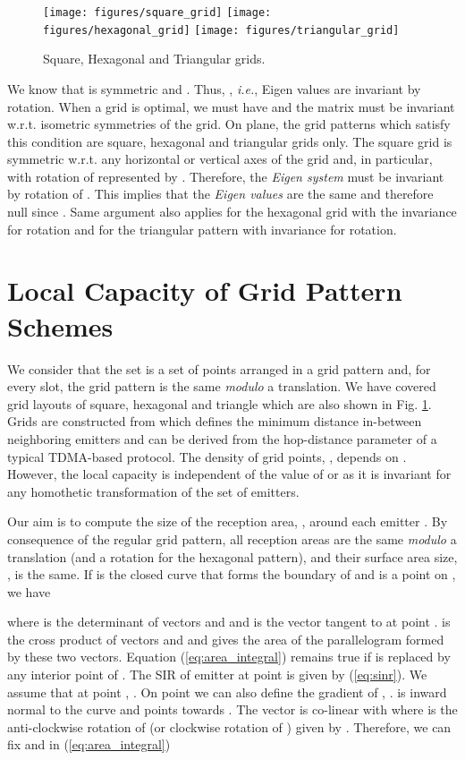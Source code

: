 \documentclass[12pt,english]{article}
\begin{document}
\begin{figure}[!t]
\centering
{}
\texttt{[image: figures/square\_grid]}
\texttt{[image: figures/hexagonal\_grid]}
\texttt{[image: figures/triangular\_grid]}
\caption{Square, Hexagonal and Triangular grids.}
\label{fig:grid_layouts}
\end{figure}

We know that  is symmetric and . Thus, \mbox{}, {\it i.e.}, Eigen values are invariant by rotation. When a grid is optimal, we must have \mbox{} and the matrix  must be invariant w.r.t. isometric symmetries of the grid. On  plane, the grid patterns which satisfy this condition are square, hexagonal and triangular grids only. The square grid is symmetric w.r.t. any horizontal or vertical axes of the grid and, in particular, with rotation of  represented by . Therefore, the {\em Eigen system} must be invariant by rotation of . This implies that the {\em Eigen values} are the same and therefore null since \mbox{}. Same argument also applies for the hexagonal grid with the invariance for  rotation and for the triangular pattern with invariance for  rotation. 

\section{Local Capacity of Grid Pattern Schemes}
\label{sec:rx_area_2}

We consider that the set  is a set of points arranged in a grid pattern and, for every slot, the grid pattern is the same {\em modulo} a translation. We have covered grid layouts of square, hexagonal and triangle which are also shown in Fig. \ref{fig:grid_layouts}. Grids are constructed from  which defines the minimum distance in-between neighboring emitters and can be derived from the hop-distance parameter of a typical TDMA-based protocol. The density of grid points, , depends on . However, the local capacity is independent of the value of  or  as it is invariant for any homothetic transformation of the set of emitters. 

Our aim is to compute the size of the reception area, , around each emitter . By consequence of the regular grid pattern, all reception areas are the same {\em modulo} a translation (and a rotation for the hexagonal pattern), and their surface area size, , is the same.  If  is the closed curve that forms the boundary of  and  is a point on , we have

where  is the determinant of vectors  and  and  is the vector tangent to  at point . \mbox{} is the cross product of vectors  and  and gives the area of the parallelogram formed by these two vectors. Equation (\ref{eq:area_integral}) remains true if  is replaced by any interior point of . The SIR  of emitter  at point  is given by (\ref{eq:sinr}). We assume that at point , . On point  we can also define the gradient of , .
 is inward normal to the curve  and points towards . The vector  is co-linear with  where  is the anti-clockwise rotation of  (or clockwise rotation of ) given by
. 
Therefore, we can fix  and in (\ref{eq:area_integral}) 
\end{document}
